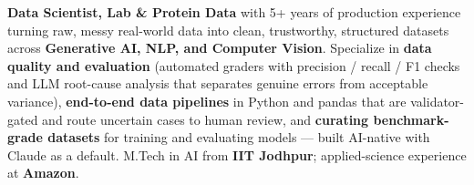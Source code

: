 \documentclass[letter,10pt]{article}
\begin{document}

\textbf{Data Scientist, Lab \& Protein Data} with 5+ years of production experience turning raw, messy real-world data into clean, trustworthy, structured datasets across \textbf{Generative AI, NLP, and Computer Vision}.
Specialize in \textbf{data quality and evaluation} (automated graders with precision / recall / F1 checks and LLM root-cause analysis that separates genuine errors from acceptable variance), \textbf{end-to-end data pipelines} in Python and pandas that are validator-gated and route uncertain cases to human review, and \textbf{curating benchmark-grade datasets} for training and evaluating models --- built AI-native with Claude as a default.
M.Tech in AI from \textbf{IIT Jodhpur}; applied-science experience at \textbf{Amazon}.
\end{document}
